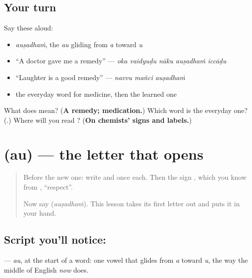 \subsection*{Your turn}
Say these aloud:

\begin{itemize}
\raggedright
  \item \emph{auṣadhaṁ}, the \emph{au} gliding from \emph{a} toward \emph{u}
  \item \textquotedblleft{}A doctor gave me a remedy\textquotedblright{} — \emph{oka vaidyuḍu nāku auṣadhaṁ iccāḍu}
  \item \textquotedblleft{}Laughter is a good remedy\textquotedblright{} — \emph{navvu mañci auṣadhaṁ}
  \item the everyday word for medicine, then the learned one
\end{itemize}

\begin{tcolorbox}[breakable,colback=teal!4,colframe=teal!35!black,title={Before you move on}]
What does \textbf{} mean? (\textbf{A remedy; medication.}) Which word is the everyday one? (\textbf{}.) Where will you read \textbf{}? (\textbf{On chemists' signs and labels.})
\end{tcolorbox}
\section[\texorpdfstring{\te{ఔ} (au)}{ఔ (au)}]{ (au) — the letter that opens }

\label{lesson:TE-S177-letter-au}



\begin{quote}
Before the new one: write \textbf{} and \textbf{} once each. Then the sign \textbf{}, which you know from \textbf{}, \textquotedblleft{}respect\textquotedblright{}.

Now say \textbf{} (\emph{auṣadhaṁ}). This lesson takes its first letter out and puts it in your hand.
\end{quote}

\subsection*{Script you'll notice: }
\textbf{} — \emph{au}, at the start of a word: one vowel that glides from \emph{a} toward \emph{u}, the way the middle of English \emph{now} does.

